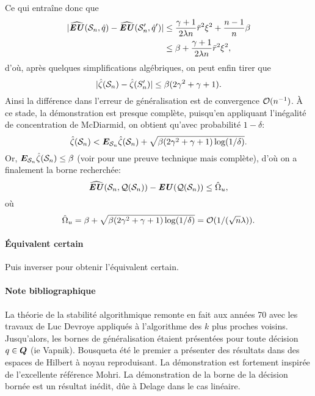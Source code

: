 Ce qui entraîne donc que
\begin{align}
  |\hEU(\S_n,\hat q) - \hEU(\S_n',\hat q')| &\leq \frac{\gamma+1}{2\lambda n}\rmax^2\xi^2 +
                                              \frac{n-1}{n}\beta\\
                                            &\leq \beta + \frac{\gamma+1}{2\lambda n}\rmax^2\xi^2,
\end{align}
d'où, après quelques simplifications algébriques, on peut enfin tirer que
\begin{equation}
  |\hat\zeta(\S_n) - \hat\zeta(S'_n)| \leq \beta(2\gamma^2 + \gamma + 1).
\end{equation}
Ainsi la différence dans l'erreur de généralisation est de convergence $\O(n^{-1})$. À ce
stade, la démonstration est presque complète, puisqu'en appliquant l'inégalité de
concentration de McDiarmid, on obtient qu'avec probabilité $1-\delta$:
\begin{equation}
  \hat\zeta(\S_n) < \E_{\S_n}\hat\zeta(\S_n) + \sqrt{\beta(2\gamma^2+\gamma+1)\log(1/\delta)}.
\end{equation}
Or, $\E_{\S_n}\hat\zeta(\S_n) \leq \beta$ (voir \cite{mohri2012foundations} pour une preuve technique
mais complète), d'où on a finalement la borne recherchée:
\begin{equation}
  \hEU(\S_n,\alg(\S_n)) - \EU(\alg(\S_n)) \leq \hat \Omega_u,
\end{equation}
où
\begin{equation}
  \hat\Omega_u = \beta + \sqrt{\beta(2\gamma^2+\gamma+1)\log(1/\delta)} = \O(1/(\sqrt{n}\lambda)).
\end{equation}

\paragraph{Équivalent certain}

Puis inverser pour obtenir l'équivalent certain.

\paragraph{Note bibliographique}

La théorie de la stabilité algorithmique remonte en fait aux années 70 avec les travaux de
Luc Devroye appliqués à l'algorithme des $k$ plus proches voisins\cit. Jusqu'alors, les
bornes de généralisation étaient présentées pour toute décision $q \in \Q$ (ie
Vapnik). Bousquet\cit a été le premier a présenter des résultats dans des espaces de
Hilbert à noyau reproduisant. La démonstration est fortement inspirée de l'excellente
référence Mohri\cit. La démonstration de la borne de la décision bornée est un résultat
inédit, dûe à Delage dans le cas linéaire.


